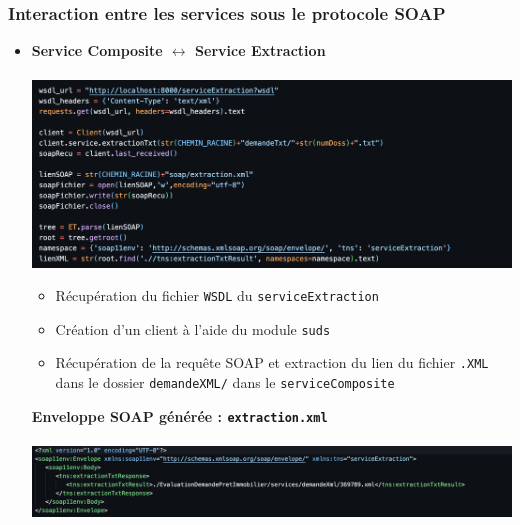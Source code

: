 \documentclass{article}
\begin{document}
      \subsubsection{Interaction entre les services sous le protocole SOAP}
      \begin{itemize}
          \item \textbf{Service Composite $\leftrightarrow$ Service Extraction} \\ \\
          \includegraphics[width=\textwidth]{Images/7.3/wsdlExtraction.png}\\
          \begin{itemize}
              \item Récupération du fichier \texttt{WSDL} du \texttt{serviceExtraction}
              \item Création d'un client à l'aide du module \texttt{suds}
              \item Récupération de la requête SOAP et extraction du lien du fichier \texttt{.XML} dans le dossier \texttt{demandeXML/} dans le \texttt{serviceComposite}
          \end{itemize}
          \textbf{Enveloppe SOAP générée : \texttt{extraction.xml}}\\ \\
          \includegraphics[width=\textwidth]{Images/7.3/SOAPExtraction.png}
          

\end{itemize}
\end{document}
